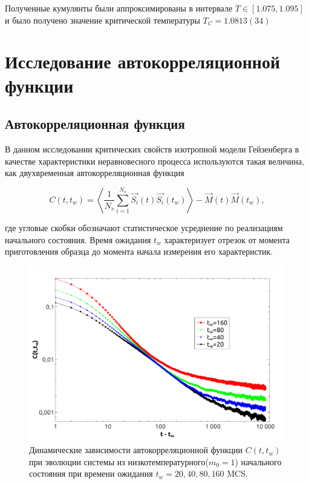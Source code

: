 \documentclass[a4paper,14pt]{extarticle}
\begin{document}
Полученные кумулянты были аппроксимированы в интервале $T \in [1.075, 1.095]$ и было получено значение критической температуры $T_C = 1.0813(34)$

\section{Исследование автокорреляционной функции}
\subsection{Автокорреляционная функция}
В данном исследовании критических свойств изотропной модели Гейзенберга в качестве характеристики неравновесного процесса
используются такая величина, как двухвременная автокорреляционная функция
 
 \begin{equation}
   {C}(t,t_w) = \left\langle \frac{1}{N_s} \sum_{i=1}^{N_s} \overrightarrow{S_i}(t) \overrightarrow{S_i}(t_w) \right\rangle - \overrightarrow{M}(t) \overrightarrow{M}(t_w),
\end{equation}

где угловые скобки обозначают статистическое усреднение по реализациям начального состояния. Время ожидания $t_w$ характеризует отрезок
от момента приготовления образца до момента начала
измерения его характеристик.

\begin{figure}[h!]
	\begin{center}
		\includegraphics[width=0.99\textwidth]{C.pdf}
		\caption{\label{testSolution} Динамические зависимости автокорреляционной функции $C(t,t_w)$ при эволюции системы из низкотемпературного($m_0=1$) начального состояния при времени ожидания $t_w=20,40,80,160$ MCS.}
	\end{center}
\end{figure}
\end{document}
